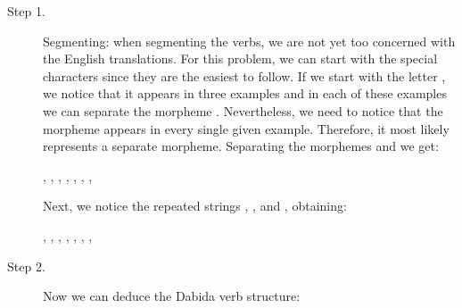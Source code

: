 \begin{refsection}
\begin{mysolution}
  \begin{description}
    \item[Step 1.] Segmenting: when segmenting the verbs, we are not yet too concerned with the English translations. For this problem, we can start with the special characters since they are the easiest to follow. If we start with the letter , we notice that it appears in three examples and in each of these examples we can separate the morpheme . Nevertheless, we need to notice that the morpheme  appears in every single given example. Therefore, it most likely represents a separate morpheme. Separating the morphemes  and  we get:

\begin{center}
    , , , , ,
    , , 
\end{center}

 Next, we notice the repeated strings , , and , obtaining:

\begin{center}
    , , , , ,
    , , 
\end{center}

 \item[Step 2.] Now we can deduce the Dabida verb structure:


\end{description}
\end{mysolution}
\end{refsection}
